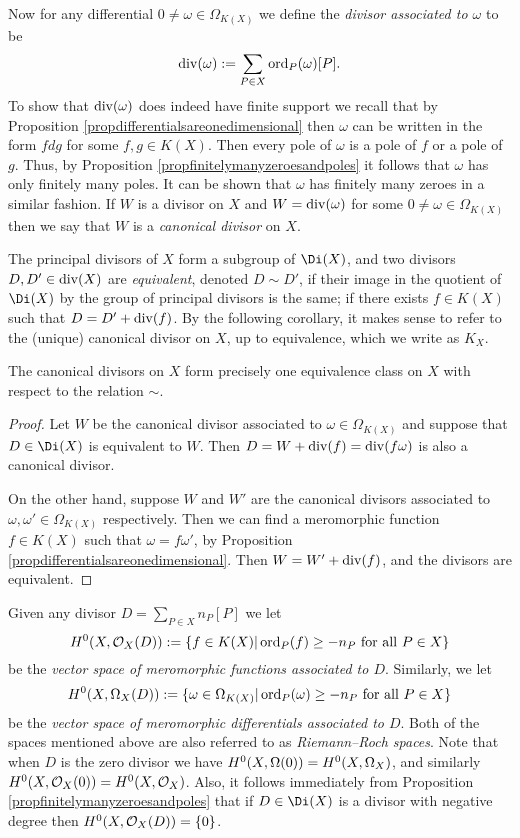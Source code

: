 Now for any differential $0 \neq \omega \in \Omega_{K(X)}$ we define the \emph{divisor associated to $\omega$} to be
    \[
    \operatorname{div}(\omega) := \sum_{P \in X} \operatorname{ord}_P(\omega)[P].
    \]
To show that $\operatorname{div}(\omega)$ does indeed have finite support we recall that by Proposition \ref{propdifferentialsareonedimensional} then $\omega$ can be written in the form $fdg$ for some $f, g \in K(X)$.
Then every pole of $\omega$ is a pole of $f$ or a pole of $g$.
Thus, by Proposition \ref{propfinitelymanyzeroesandpoles} it follows that $\omega$ has only finitely many poles.
It can be shown that $\omega$ has finitely many zeroes in a similar fashion.
If $W$ is a divisor on $X$ and $W = \operatorname{div}(\omega)$ for some $ 0 \neq \omega \in \Omega_{K(X)}$ then we say that $W$ is a \emph{canonical divisor} on $X$.

The principal divisors of $X$ form a subgroup of $\Di(X)$, and two divisors $D, D' \in \operatorname{div}(X)$ are \emph{equivalent}, denoted $D \sim D'$, if their image in the quotient of $\Di(X)$ by the group of principal divisors is the same; \ie if there exists $f \in K(X)$ such that $ D = D' + \operatorname{div}(f)$.
By the following corollary, it makes sense to refer to the (unique) canonical divisor on $X$, up to equivalence, which we write as $K_X$.

    \begin{cor}
    The canonical divisors on $X$ form precisely one equivalence class on $X$ with respect to the relation $\sim$.
    \end{cor}
    \begin{proof}
    Let $W$ be the canonical divisor associated to $\omega \in \Omega_{K(X)}$ and suppose that $D \in \Di(X)$ is equivalent to $W$.
    Then $D = W + \operatorname{div}(f) = \operatorname{div}(f \omega)$ is also a canonical divisor.

    On the other hand, suppose $W$ and $W'$ are the canonical divisors associated to $\omega, \omega' \in \Omega_{K(X)}$ respectively.
    Then we can find a meromorphic function $f \in K(X)$ such that $\omega = f\omega'$, by Proposition \ref{propdifferentialsareonedimensional}.
    Then $W = W' + \operatorname{div}(f)$, and the divisors are equivalent.
    \end{proof}

Given any divisor $D = \sum_{P \in X} n_P[P]$ we let
    \[
    H^0(X,{\cal O}_X(D)) : = \{ f \in K(X) | \operatorname{ord}_P(f) \geq -n_P\ \text{for all}\ P \in X\}
    \]
be the \emph{vector space of meromorphic functions associated to $D$}.
Similarly, we let 
    \[
    H^0(X,\Omega_X(D)) :  = \{ \omega \in \Omega_{K(X)} | \operatorname{ord}_P(\omega) \geq -n_P \ \text{for all} \ P \in X\}
    \]
be the \emph{vector space of meromorphic differentials associated to $D$}.
Both of the spaces mentioned above are also referred to as \emph{Riemann--Roch spaces}.
Note that when $D$ is the zero divisor we have $H^0(X,\Omega(0)) = {H^0(X,\Omega_X)}$, and similarly $H^0(X,{\cal O}_X(0)) = H^0(X,{\cal O}_X)$.
Also, it follows immediately from Proposition \ref{propfinitelymanyzeroesandpoles} that if $D \in \Di(X)$ is a divisor with negative degree then $H^0(X,{\cal O}_X(D)) = \{0\}$.

